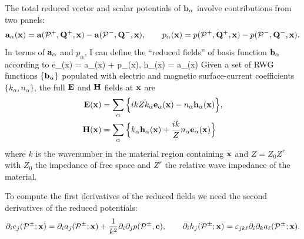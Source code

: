\documentclass[letterpaper]{article}
\begin{document}
The total reduced vector and scalar potentials of $\mathbf{b}_\alpha$
involve contributions from two panels:
$$ \mathbf{a}_\alpha(\mathbf{x}) = \mathbf{a}(\mathcal{P}^+, \mathbf{Q}^+, \mathbf{x}) - 
                     \mathbf{a}(\mathcal{P}^-, \mathbf{Q}^-, \mathbf{x}), 
   \qquad 
   p_\alpha(\mathbf{x}) = p(\mathcal{P}^+, \mathbf{Q}^+, \mathbf{x}) - 
                     p(\mathcal{P}^-, \mathbf{Q}^-, \mathbf{x}).
$$
In terms of $\mathbf{a}_\alpha$ and $p_\alpha$, I can define the 
``reduced fields'' of basis function $\mathbf{b}_\alpha$ according to
 { \vb e_\alpha(\vb x) 
   = \vb a_\alpha(\vb x) +  \nabla p_\alpha(\vb x), 
  \qquad 
  \vb h_\alpha(\vb x) = 
   \nabla \times \vb a_\alpha(\vb x)
 } 
Given a set of RWG functions $\{\mathbf{b}_\alpha\}$ populated
with electric and magnetic surface-current coefficients 
$\{k_\alpha, n_\alpha\}$, the full $\mathbf{E}$ and $\mathbf{H}$ fields at
$\mathbf{x}$ are 
\begin{align*}
 \mathbf{E}(\mathbf{x}) 
&= \sum_\alpha\Big\{  ikZ k_\alpha \mathbf{e}_\alpha(\mathbf{x})
                     -n_\alpha \mathbf{h}_\alpha(\mathbf{x})
              \Big\},
\\
 \mathbf{H}(\mathbf{x}) 
&= \sum_\alpha\Big\{  k_\alpha \mathbf{h}_\alpha(\mathbf{x})
                     +\frac{ik}{Z} n_\alpha \mathbf{e}_\alpha(\mathbf{x})
              \Big\}
\end{align*}
where $k$ is the wavenumber in the material region containing 
$\mathbf{x}$ and $Z=Z_0 Z^r$ with $Z_0$ the impedance of free space 
and $Z^r$ the relative wave impedance of the material.

To compute the first derivatives of the reduced fields we 
need the second derivatives of the reduced potentials:
$$ \partial_i e_j(\mathcal{P}^\pm; \mathbf{x})
   =   \partial_i a_j(\mathcal{P}^\pm; \mathbf{x}) 
     + \frac{1}{k^2}\partial_i \partial_j p(\mathcal{P}^\pm, \mathbf{c}),
  \qquad
   \partial_i h_j(\mathcal{P}^\pm; \mathbf{x})
   =\varepsilon_{jk\ell} \partial_i \partial_k a_\ell(\mathcal{P}^\pm; \mathbf{x}).
$$

\end{document}
